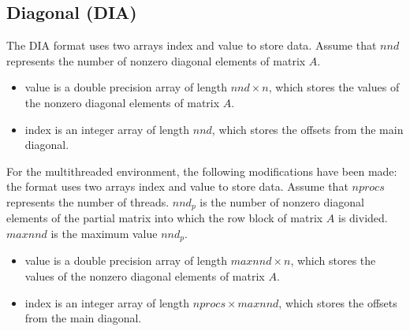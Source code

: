 \documentclass[a4paper]{article}
\begin{document}
\newpage
\subsection{Diagonal (DIA)}
The DIA format uses two arrays {\ttfamily index} and {\ttfamily value} to store
data. Assume that $nnd$ represents the number of nonzero diagonal
elements of matrix $A$.
\begin{itemize}
\item {\ttfamily value} is a double precision array of length
      $nnd \times n$, which stores the values of the nonzero diagonal elements of matrix $A$.
\item {\ttfamily index} is an integer array of length $nnd$,
      which stores the offsets from the main diagonal.
\end{itemize}

For the multithreaded environment, the following modifications have been made:
the format uses two arrays {\ttfamily index} and {\ttfamily value} to store
data. Assume that $nprocs$ represents the number of threads.
$nnd_p$ is the number of nonzero diagonal elements of the partial matrix into which the row block of matrix $A$ is divided.
$maxnnd$ is the maximum value $nnd_p$.
\begin{itemize}
\item {\ttfamily value} is a double precision array of length 
      $maxnnd \times n$, which stores the values of the nonzero diagonal elements of matrix $A$.
\item {\ttfamily index} is an integer array of length $nprocs
      \times maxnnd$, which stores the offsets from the main diagonal.
\end{itemize}
\end{document}
